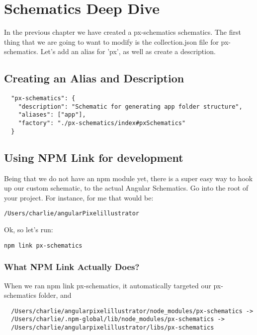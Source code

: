 \maketitle{}
\section{ Schematics Deep Dive }

In the previous chapter we have created a px-schematics schematics. The first
thing that we are going to want to modify is the collection.json file for
px-schematics. Let's add an alias for 'px', as well as create a description.

\subsection{ Creating an Alias and Description }
\begin{lstlisting}
  "px-schematics": {
    "description": "Schematic for generating app folder structure",
    "aliases": ["app"],
    "factory": "./px-schematics/index#pxSchematics"
  }
\end{lstlisting}

\subsection{ Using NPM Link for development }
Being that we do not have an npm module yet, there is a super easy way to hook
up our custom schematic, to the actual Angular Schematics. Go into the root
of your project. For instance, for me that would be:
\begin{verbatim}
/Users/charlie/angularPixelillustrator
\end{verbatim}

Ok, so let's run:
\begin{verbatim}
npm link px-schematics
\end{verbatim}

\subsubsection{ What NPM Link Actually Does? }
When we ran npm link px-schematics, it automatically targeted our px-schematics
folder, and
\begin{lstlisting}
  /Users/charlie/angularpixelillustrator/node_modules/px-schematics ->
  /Users/charlie/.npm-global/lib/node_modules/px-schematics ->
  /Users/charlie/angularpixelillustrator/libs/px-schematics
\end{lstlisting}


